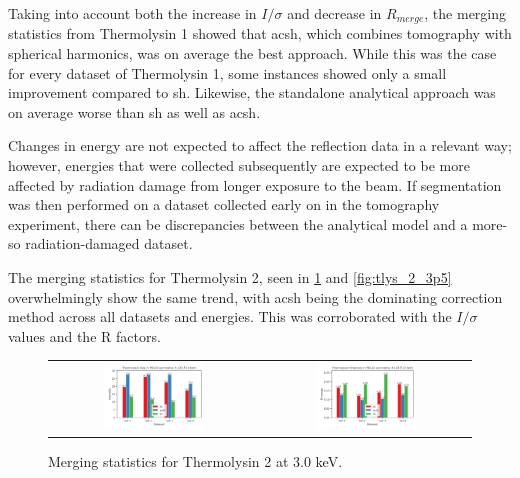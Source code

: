 Taking into account both the increase in $I/\sigma$ and decrease in $R_{merge}$, the merging statistics from Thermolysin 1 showed that \ac{acsh}, which combines tomography with spherical harmonics, was on average the best approach. While this was the case for every dataset of Thermolysin 1, some instances showed only a small improvement compared to \ac{sh}. Likewise, the standalone analytical approach was on average worse than \ac{sh} as well as \ac{acsh}.

Changes in energy are not expected to affect the reflection data in a relevant way; however, energies that were collected subsequently are expected to be more affected by radiation damage from longer exposure to the beam. If segmentation was then performed on a dataset collected early on in the tomography experiment, there can be discrepancies between the analytical model and a more-so radiation-damaged dataset.


The merging statistics for Thermolysin 2, seen in \cref{fig:tlys_2_3p0} and \cref{fig:tlys_2_3p5} overwhelmingly show the same trend, with \ac{acsh} being the dominating correction method across all datasets and energies. This was corroborated with the $I/\sigma$ values and the R factors.

\begin{figure}[h]
    \centering
    \begin{tabular}{cc}
    \includegraphics[width = 0.5\textwidth]{plots/exp1/tlys_2_P6122/3p0_I_over_sigma.png} & \includegraphics[width = 0.5\textwidth]{plots/exp1/tlys_2_P6122/3p0_rmerges.png}
    \end{tabular}
    \caption{Merging statistics for Thermolysin 2 at 3.0 \unit{keV}.}
    \label{fig:tlys_2_3p0}
\end{figure}

